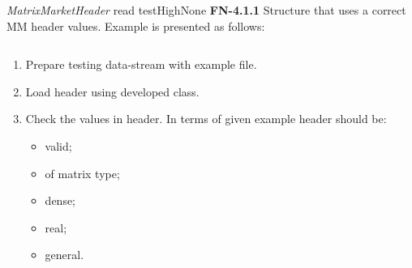 \begin{testcase}{\emph{MatrixMarketHeader} read test}{High}{None}
	{
		\textbf{FN-4.1.1}
	}
	{
		Structure that uses a correct \gls{MM} header values. Example is presented as follows:
	}
	\begin{lstlisting}[caption={\gls{MM} Header Example},frame=single]
%%MatrixMarket matrix array real general
	\end{lstlisting}
	{
		\begin{enumerate}
			\item Prepare testing data-stream with example file.
			\item Load header using developed class.
			\item
			{
				Check the values in header. In terms of given example header should be:
				\begin{itemize}
					\item valid;
					\item of matrix type;
					\item dense;
					\item real;
					\item general.
				\end{itemize}
			}
		\end{enumerate}
	}
\end{testcase}